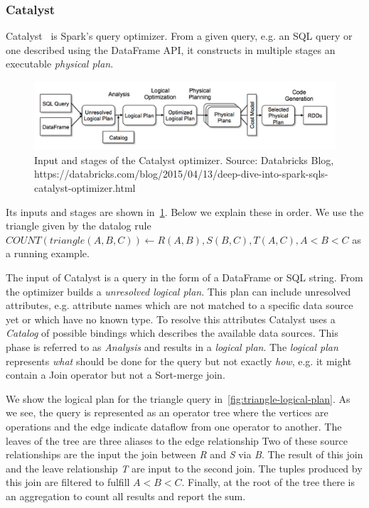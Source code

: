 \subsubsection{Catalyst} \label{subsubsec:catalyst}
Catalyst~\cite{spark-sql} is Spark's query optimizer.
From a given query, e.g. an SQL query or one described using the DataFrame API, it constructs
in multiple stages an executable \textit{physical plan}.
\begin{figure}
    \includegraphics[width=\textwidth]{figures/catalyst-stages.png}
    \caption{
      Input and stages of the Catalyst optimizer.
      Source: Databricks Blog, https://databricks.com/blog/2015/04/13/deep-dive-into-spark-sqls-catalyst-optimizer.html
    }
    \label{fig:catalyst-stages}
\end{figure}
Its inputs and stages are shown in~\cref{fig:catalyst-stages}.
Below we explain these in order.
We use the triangle given by the datalog rule $COUNT(triangle(A, B, C)) \leftarrow R(A, B), S(B, C), T(A, C), A < B < C $ as
a running example.

The input of Catalyst is a query in the form of a DataFrame or SQL string.
From the optimizer builds a \textit{unresolved logical plan}.
This plan can include unresolved attributes, e.g. attribute names which are not matched to a specific
data source yet or which have no known type.
To resolve this attributes Catalyst uses a \textit{Catalog} of possible bindings which describes the
available data sources.
This phase is referred to as \textit{Analysis} and results in a \textit{logical plan}.
The \textit{logical plan} represents \textit{what} should be done for the query but not exactly \textit{how},
e.g. it might contain a Join operator but not a Sort-merge join.

We show the logical plan for the triangle query in~\cref{fig:triangle-logical-plan}.
As we see, the query is represented as an operator tree where the vertices are operations and the edge indicate dataflow from
one operator to another.
The leaves of the tree are three aliases to the edge relationship
Two of these source relationships are the input the join between \textit{R} and \textit{S} via \textit{B}.
The result of this join and the leave relationship \textit{T} are input to the second join.
The tuples produced by this join are filtered to fulfill $A < B < C$.
Finally, at the root of the tree there is an aggregation to count all results and report the sum.

